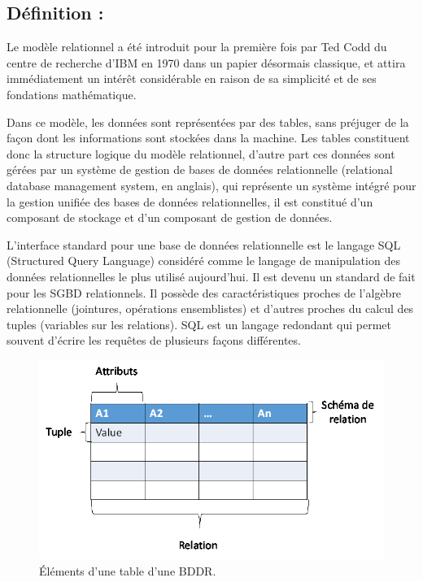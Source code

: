 \subsection{Définition : }
Le modèle relationnel a été introduit pour la première fois par Ted Codd du centre de recherche d’IBM en 1970 dans un papier désormais classique, et attira immédiatement un intérêt considérable en raison de sa simplicité et de ses fondations mathématique.

Dans ce modèle, les données sont représentées par des tables, sans préjuger de la façon dont les informations sont stockées dans la machine. Les tables constituent donc la structure logique du modèle relationnel, d’autre part ces données sont gérées par un système de gestion de bases de données relationnelle (relational database management system, en anglais), qui représente un système intégré pour la gestion unifiée des bases de données relationnelles, il est constitué d’un composant de stockage et d’un composant de gestion de données.

L’interface standard pour une base de données relationnelle est le langage SQL (Structured Query Language) considéré comme le langage de manipulation des données relationnelles le plus utilisé aujourd’hui. Il est devenu un standard de fait pour les SGBD relationnels. Il possède des caractéristiques proches de l’algèbre relationnelle (jointures, opérations ensemblistes) et d’autres proches du calcul des tuples (variables sur les relations). SQL est un langage redondant qui permet souvent d'écrire les requêtes de plusieurs façons différentes.

\begin{figure}[h]
	\centering
    \includegraphics[scale=0.5]{img/part1/4.0.1}
    \caption{Éléments d'une table d'une BDDR.}
\end{figure}